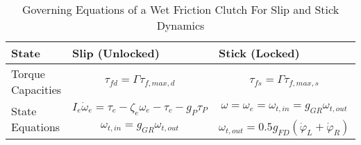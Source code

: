 \begin{table}[h]
\footnotesize
\caption{Governing Equations of a Wet Friction Clutch For Slip and Stick Dynamics}
\label{table:Wet_Friction_Clutch}
\vspace{5pt}
    \begin{tabular}{|m{0.69in}|m{2.2in}|m{2.5in}|}
    \hline
         \vspace{2pt} \centering State  & \vspace{2pt}\vbox{\centering Slip (Unlocked)\vspace{-14pt}} & \vspace{2pt}  \vbox{\centering Stick (Locked)\vspace{-14pt}}  \\ 
    \hline
        \centering Torque Capacities & 
         \vspace{-10pt} \begin{equation}  \tau_{fd} = \Gamma\tau_{f,max,d} \end{equation} \vspace{-15pt} & 
         \vspace{-10pt} \begin{equation}  \tau_{fs} = \Gamma\tau_{f,max,s} \end{equation} \vspace{-15pt} \\
    \hline  
        \multirow{3}{0.69in}{\centering State Equations} & \vspace{-15pt} \begin{equation} I_e\dot\omega_e = \tau_e - \zeta_e\omega_e - \tau_c - g_P\tau_P \end{equation} \vspace{-15pt}  & \vspace{-15pt}\begin{equation} \omega = \omega_e = \omega_{t,in} = g_{GR}\omega_{t,out} \end{equation} \vspace{-15pt} \\
                                             & \vspace{-15pt}  \begin{equation} \omega_{t,in} = g_{GR}\omega_{t,out} \end{equation} \vspace{-15pt}      & \vspace{-15pt} \begin{equation} \omega_{t,out} = 0.5g_{FD}(\dot\varphi_L + \dot\varphi_R) \end{equation} \vspace{-15pt} \\

\end{tabular}
\end{table}
